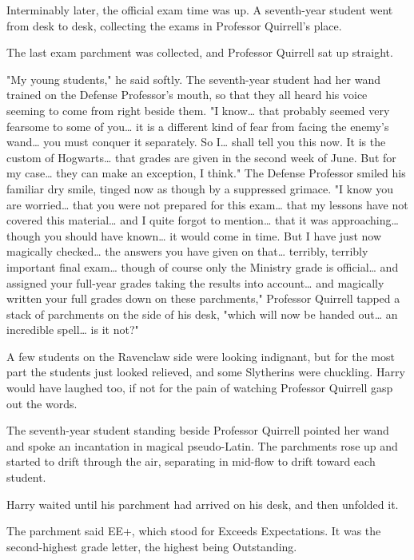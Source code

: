 Interminably later, the official exam time was up. A seventh-year student went 
from desk to desk, collecting the exams in Professor Quirrell's place.

The last exam parchment was collected, and Professor Quirrell sat up straight.

"My young students," he said softly. The seventh-year student had her wand 
trained on the Defense Professor's mouth, so that they all heard his voice 
seeming to come from right beside them. "I know{\ldots} that probably seemed 
very fearsome to some of you{\ldots} it is a different kind of fear from facing 
the enemy's wand{\ldots} you must conquer it separately. So I{\ldots} shall 
tell you this now. It is the custom of Hogwarts{\ldots} that grades are given 
in the second week of June. But for my case{\ldots} they can make an exception, 
I think." The Defense Professor smiled his familiar dry smile, tinged now as 
though by a suppressed grimace. "I know you are worried{\ldots} that you were 
not prepared for this exam{\ldots} that my lessons have not covered this 
material{\ldots} and I quite forgot to mention{\ldots} that it was 
approaching{\ldots} though you should have known{\ldots} it would come in time. 
But I have just now magically checked{\ldots} the answers you have given on 
that{\ldots} terribly, terribly important final exam{\ldots} though of course 
only the Ministry grade is official{\ldots} and assigned your full-year grades 
taking the results into account{\ldots} and magically written your full grades 
down on these parchments," Professor Quirrell tapped a stack of parchments on 
the side of his desk, "which will now be handed out{\ldots} an incredible 
spell{\ldots} is it not?"

A few students on the Ravenclaw side were looking indignant, but for the most 
part the students just looked relieved, and some Slytherins were chuckling. 
Harry would have laughed too, if not for the pain of watching Professor 
Quirrell gasp out the words.

The seventh-year student standing beside Professor Quirrell pointed her wand 
and spoke an incantation in magical pseudo-Latin. The parchments rose up and 
started to drift through the air, separating in mid-flow to drift toward each 
student.

Harry waited until his parchment had arrived on his desk, and then unfolded it.

The parchment said EE+, which stood for Exceeds Expectations. It was the 
second-highest grade letter, the highest being Outstanding.

